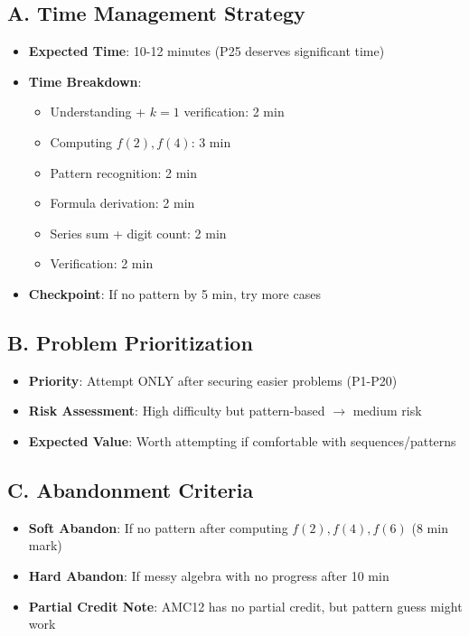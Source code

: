 \documentclass[]{article}
\begin{document}
\begin{competitionbox}
\subsection*{A. Time Management Strategy}
\begin{itemize}[leftmargin=*]
    \item \textbf{Expected Time}: 10-12 minutes (P25 deserves significant time)
    \item \textbf{Time Breakdown}:
    \begin{itemize}
        \item Understanding + $k=1$ verification: 2 min
        \item Computing $f(2), f(4)$: 3 min
        \item Pattern recognition: 2 min
        \item Formula derivation: 2 min
        \item Series sum + digit count: 2 min
        \item Verification: 2 min
    \end{itemize}
    \item \textbf{Checkpoint}: If no pattern by 5 min, try more cases
\end{itemize}

\subsection*{B. Problem Prioritization}
\begin{itemize}[leftmargin=*]
    \item \textbf{Priority}: Attempt ONLY after securing easier problems (P1-P20)
    \item \textbf{Risk Assessment}: High difficulty but pattern-based $\to$ medium risk
    \item \textbf{Expected Value}: Worth attempting if comfortable with sequences/patterns
\end{itemize}

\subsection*{C. Abandonment Criteria}
\begin{itemize}[leftmargin=*]
    \item \textbf{Soft Abandon}: If no pattern after computing $f(2), f(4), f(6)$ (8 min mark)
    \item \textbf{Hard Abandon}: If messy algebra with no progress after 10 min
    \item \textbf{Partial Credit Note}: AMC12 has no partial credit, but pattern guess might work
\end{itemize}
\end{competitionbox}
\end{document}
